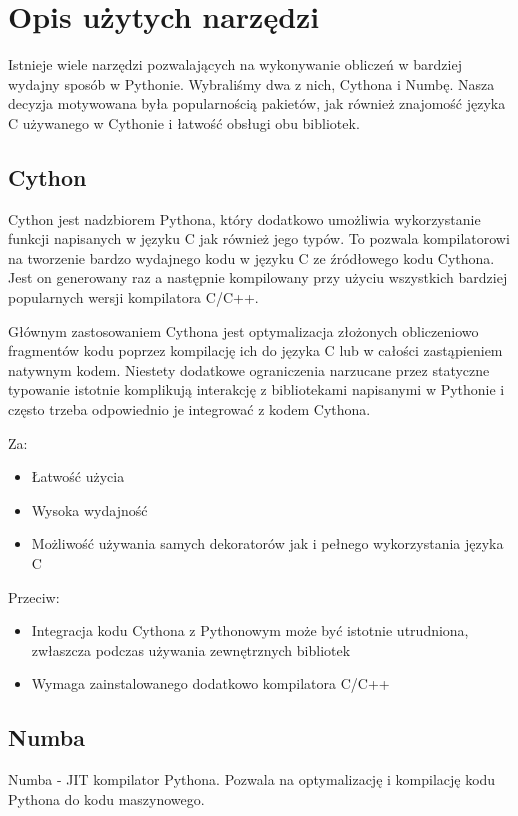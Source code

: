 \section{Opis użytych narzędzi}
Istnieje wiele narzędzi pozwalających na wykonywanie obliczeń w bardziej wydajny sposób w Pythonie. Wybraliśmy dwa z nich, Cythona i Numbę. Nasza decyzja motywowana była popularnością pakietów, jak również znajomość języka C używanego w Cythonie i łatwość obsługi obu bibliotek.
        
\subsection{Cython}
Cython jest nadzbiorem Pythona, który dodatkowo umożliwia wykorzystanie funkcji napisanych w języku C jak również jego typów. To pozwala kompilatorowi na tworzenie bardzo wydajnego kodu w języku C ze źródłowego kodu Cythona. Jest on generowany raz a następnie kompilowany przy użyciu wszystkich bardziej popularnych wersji kompilatora C/C++.

Głównym zastosowaniem Cythona jest optymalizacja złożonych obliczeniowo fragmentów kodu poprzez kompilację ich do języka C lub w całości zastąpieniem natywnym kodem. Niestety dodatkowe ograniczenia narzucane przez statyczne typowanie istotnie komplikują interakcję z bibliotekami napisanymi w Pythonie i często trzeba odpowiednio je integrować z kodem Cythona.

Za:
\begin{itemize}
    \item Łatwość użycia
    \item Wysoka wydajność
    \item Możliwość używania samych dekoratorów jak i pełnego wykorzystania języka C
\end{itemize}

Przeciw:
\begin{itemize}
    \item Integracja kodu Cythona z Pythonowym może być istotnie utrudniona, zwłaszcza podczas używania zewnętrznych bibliotek
    \item Wymaga zainstalowanego dodatkowo kompilatora C/C++
\end{itemize}


\subsection{Numba}
Numba - JIT kompilator Pythona. Pozwala na optymalizację i kompilację  kodu Pythona do kodu maszynowego.

